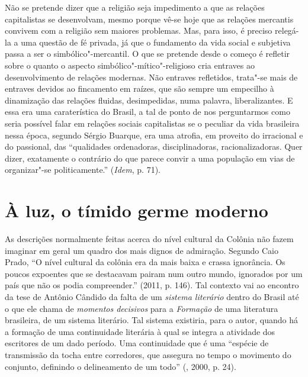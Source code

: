 Não se pretende dizer que a religião seja impedimento a que as relações
capitalistas se desenvolvam, mesmo porque vê-se hoje que as relações
mercantis convivem com a religião sem maiores problemas. Mas, para isso,
é preciso relegá-la a uma questão de fé privada, já que o fundamento da
vida social e subjetiva passa a ser o simbólico"-mercantil. O que se
pretende desde o começo é refletir sobre o quanto o aspecto
simbólico"-mítico"-religioso cria entraves ao desenvolvimento de relações
modernas. Não entraves refletidos, trata"-se mais de entraves devidos ao
fincamento em raízes, que são sempre um empecilho à dinamização das
relações fluidas, desimpedidas, numa palavra, liberalizantes. E essa era
uma caraterística do Brasil, a tal de ponto de nos perguntarmos como
seria possível falar em relações sociais capitalistas se o peculiar da
vida brasileira nessa época, segundo Sérgio Buarque, era uma atrofia, em
proveito do irracional e do passional, das ``qualidades ordenadoras,
disciplinadoras, racionalizadoras. Quer dizer, exatamente o contrário do
que parece convir a uma população em vias de organizar"-se
politicamente.'' (\emph{Idem}, p. 71).

\section{À luz, o tímido germe moderno}

As descrições normalmente feitas acerca do nível cultural da Colônia não
fazem imaginar em geral um quadro dos mais dignos de admiração. Segundo
Caio Prado, ``O nível cultural da colônia era da mais baixa e crassa
ignorância. Os poucos expoentes que se destacavam pairam num outro
mundo, ignorados por um país que não os podia compreender.'' (2011, p.
146). Tal contexto vai ao encontro da tese de Antônio Cândido da falta
de um \emph{sistema literário} dentro do Brasil até o que ele chama de
\emph{momentos decisivos} para a \emph{Formação} de uma literatura
brasileira, de um sistema literário. Tal sistema existiria, para o
autor, quando há a formação de uma continuidade literária à qual se
integra a atividade dos escritores de um dado período. Uma continuidade
que é uma ``espécie de transmissão da tocha entre corredores, que
assegura no tempo o movimento do conjunto, definindo o delineamento de
um todo'' (, 2000, p. 24).

